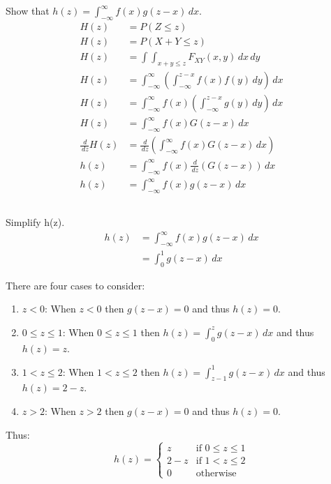 \section{}

\subsection{}

Show that $h(z) = \int_{-\infty}^{\infty} f(x) g(z - x) \,dx$.
\begin{align*}
    H(z) &= P(Z \leq z) \tag*{Let H() be the CDF of Z} \\
    H(z) &= P(X + Y \leq z) \\
    H(z) &= \int\int_{x+y\leq z} F_{XY}(x, y) \,dx \,dy \\ 
    H(z) &= \int_{- \infty}^{\infty} ( \int_{- \infty}^{z-x} f(x)f(y) \,dy ) \,dx \\ 
    H(z) &= \int_{- \infty}^{\infty} f(x) (\int_{- \infty}^{z-x} g(y) \,dy) \,dx \\
    H(z) &= \int_{- \infty}^{\infty} f(x) G(z - x) \,dx \tag*{Let G() be the CDF of Y} \\
    \frac{\,d}{\,dz}H(z) &= \frac{\,d}{\,dz}(\int_{- \infty}^{\infty} f(x) G(z - x) \,dx) \\
    h(z) &= \int_{- \infty}^{\infty} f(x) \frac{\,d}{\,dz}(G(z-x)) \,dx \\
    h(z) &= \int_{- \infty}^{\infty} f(x) g(z-x) \,dx
\end{align*}

\subsection{}

Simplify h(z).
\begin{align*}	
    h(z) &= \int_{-\infty}^{\infty} f(x) g(z-x) \,dx \tag*{From a.} \\
	&= \int_0^1 g(z-x) \,dx \tag*{Since f(x)=0 for x$<$0 and x$>$1 and f(x)=1 for x $\in$ [0,1]}
\end{align*}

There are four cases to consider:
\begin{enumerate}
    \item $z<0$: When $z<0$ then $g(z-x)=0$ and thus $h(z)=0$.
    \item $0 \leq z \leq 1$: When $0 \leq z \leq 1$ then $h(z) = \int_0^z g(z-x) \,dx$ and thus $h(z) = z$.
    \item $1 < z \leq 2$: When $1 < z \leq 2$ then $h(z) = \int_{z-1}^1 g(z-x) \,dx$ and thus $h(z) = 2-z$.
    \item $z>2$: When $z>2$ then $g(z-x)=0$ and thus $h(z)=0$.
\end{enumerate}

Thus: 
$$
h(z) = \left\{
    \begin{array}{ll}
	z & \mbox{if } 0 \leq z \leq 1 \\
	2-z & \mbox{if } 1 < z \leq 2 \\
	0 & \mbox{otherwise}
    \end{array}
\right.
$$

